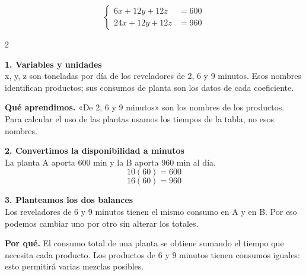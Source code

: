 \documentclass[11pt,a4paper,landscape]{article}
\begin{document}
\[\left\{\begin{aligned}6x + 12y + 12z &= 600\\24x + 12y + 12z &= 960\end{aligned}\right.\]
\begin{multicols*}{2}
\noindent\begin{minipage}{\linewidth}\textbf{1. Variables y unidades}\\[2pt]x, y, z son toneladas por día de los reveladores de 2, 6 y 9 minutos. Esos nombres identifican productos; sus consumos de planta son los datos de cada coeficiente.
\par{}\par\smallskip
\par\smallskip\textbf{Qué aprendimos.} «De 2, 6 y 9 minutos» son los nombres de los productos. Para calcular el uso de las plantas usamos los tiempos de la tabla, no esos nombres.
\end{minipage}\par\medskip
\noindent\begin{minipage}{\linewidth}\textbf{2. Convertimos la disponibilidad a minutos}\\[2pt]La planta A aporta 600 min y la B aporta 960 min al día.
\[10(60)=600\]
\[16(60)=960\]
\end{minipage}\par\medskip
\noindent\begin{minipage}{\linewidth}\textbf{3. Planteamos los dos balances}\\[2pt]Los reveladores de 6 y 9 minutos tienen el mismo consumo en A y en B. Por eso podemos cambiar uno por otro sin alterar los totales.
\par\smallskip\textbf{Por qué.} El consumo total de una planta se obtiene sumando el tiempo que necesita cada producto. Los productos de 6 y 9 minutos tienen consumos iguales: esto permitirá varias mezclas posibles.

\end{minipage}
\end{multicols*}
\end{document}
